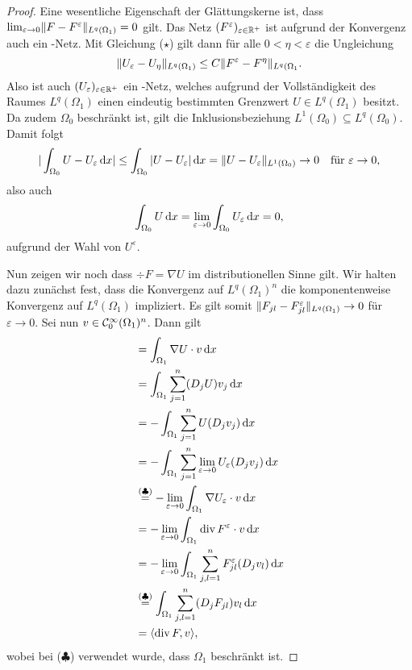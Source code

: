 \begin{proof}
  Eine wesentliche Eigenschaft der Glättungskerne ist, dass $\lim_{\varepsilon \to 0} \lVert F - F^\varepsilon \rVert_{L^q(\Omega_1)} = 0$ gilt.
  Das Netz $(F^\varepsilon)_{\varepsilon \in \mathbb{R}^+}$ ist aufgrund der Konvergenz auch ein \cauchy-Netz.
  Mit Gleichung ($\star$) gilt dann für alle $0 < \eta < \varepsilon$ die Ungleichung
  $$
    \lVert U_\varepsilon - U_\eta \rVert_{L^q(\Omega_1)}
    \leq C \lVert F^\varepsilon - F^\eta \rVert_{L^q(\Omega_1}.
  $$
  Also ist auch $(U_\varepsilon)_{\varepsilon \in \mathbb{R}^+}$ ein \cauchy-Netz, welches aufgrund der Vollständigkeit des Raumes $L^q(\Omega_1)$ einen eindeutig bestimmten Grenzwert $U \in L^q(\Omega_1)$ besitzt.
  Da zudem $\Omega_0$ beschränkt ist, gilt die Inklusionsbeziehung $L^1(\Omega_0) \subseteq L^q(\Omega_0)$.
  Damit folgt
  $$
    | \int_{\Omega_0} U - U_\varepsilon \, {\operatorname{d}\!{x}} |
    \leq  \int_{\Omega_0} | U - U_\varepsilon | \, {\operatorname{d}\!{x}} 
    = \lVert U - U_\varepsilon \rVert_{L^1(\Omega_0)} 
    \to 0 \quad\text{für } \varepsilon \to 0,
  $$
  also auch
  $$
    \int_{\Omega_0} U \, {\operatorname{d}\!{x}} = \lim_{\varepsilon \to 0} \int_{\Omega_0} U_\varepsilon \, {\operatorname{d}\!{x}} =  0,
  $$
  aufgrund der Wahl von $U^\varepsilon$.

  Nun zeigen wir noch dass $\div F = \nabla U$ im distributionellen Sinne gilt. 
  Wir halten dazu zunächst fest, dass die Konvergenz auf $L^q(\Omega_1)^n$ die komponentenweise Konvergenz auf $L^q(\Omega_1)$ impliziert.
  Es gilt somit $\lVert F_{jl} - F_{jl}^\varepsilon \rVert_{L^q(\Omega_1)} \to 0$ für $\varepsilon \to 0$.
  Sei nun $v \in \mathcal{C}_0^\infty(\Omega_1)^n$.
  Dann gilt
  \begin{align*}
    [\nabla U, v]
    &= \int_{\Omega_1} \nabla U \cdot v \d x \\
    &= \int_{\Omega_1} \sum_{j = 1}^n (D_j U) v_j \d x \\
    &= -\int_{\Omega_1} \sum_{j = 1}^n U (D_j v_j) \d x \\ 
    &= -\int_{\Omega_1} \sum_{j = 1}^n \lim_{\varepsilon \to 0} U_\varepsilon (D_j v_j) \d x \\
    &\overset{(\clubsuit)}{=} -\lim_{\varepsilon \to 0} \int_{\Omega_1} \nabla U_\varepsilon \cdot v \d x \\
    &= -\lim_{\varepsilon \to 0} \int_{\Omega_1} \div F^\varepsilon \cdot v \d x \\
    &= -\lim_{\varepsilon \to 0} \int_{\Omega_1} \sum_{j,l=1}^n F_{jl}^\varepsilon (D_j v_l) \d x \\
    &\overset{(\clubsuit)}{=} \int_{\Omega_1} \sum_{j,l=1}^n (D_j F_{jl}) v_l \d x \\
    &= \langle \div F, v \rangle,
  \end{align*}
  wobei bei ($\clubsuit$) verwendet wurde, dass $\Omega_1$ beschränkt ist.


\end{proof}
